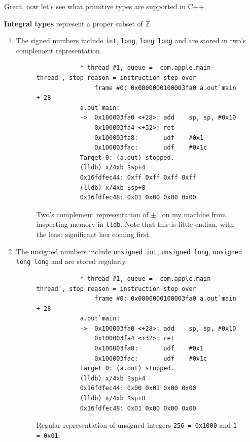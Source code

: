 \documentclass{article}
\newcounter{definition}[section]
\begin{document}
    Great, now let's see what primitive types are supported in C++.  
    
    \begin{definition}
      \label{def:integral-types}
      \textbf{Integral types} represent a proper subset of $\mathbb{Z}$. 
      \begin{enumerate}
        \item The signed numbers include \texttt{int}, \texttt{long}, \texttt{long long} and are stored in two's complement representation. 

        \begin{figure}[H]
          \centering 
          \begin{lstlisting}
            * thread #1, queue = 'com.apple.main-thread', stop reason = instruction step over
                frame #0: 0x0000000100003fa0 a.out`main + 28
            a.out`main:
            ->  0x100003fa0 <+28>: add    sp, sp, #0x10
                0x100003fa4 <+32>: ret    
                0x100003fa8:       udf    #0x1
                0x100003fac:       udf    #0x1c
            Target 0: (a.out) stopped.
            (lldb) x/4xb $sp+4
            0x16fdfec44: 0xff 0xff 0xff 0xff
            (lldb) x/4xb $sp+8
            0x16fdfec48: 0x01 0x00 0x00 0x00
          \end{lstlisting}
          \caption{Two's complement representation of $\pm1$ on my machine from inspecting memory in \texttt{lldb}. Note that this is little endian, with the least significant hex coming first.} 
          \label{fig:signed_rep}
        \end{figure} 

        \item The unsigned numbers include \texttt{unsigned int}, \texttt{unsigned long}, \texttt{unsigned long long} and are stored regularly. 

        \begin{figure}[H]
          \centering 
          \begin{lstlisting}
            * thread #1, queue = 'com.apple.main-thread', stop reason = instruction step over
                frame #0: 0x0000000100003fa0 a.out`main + 28
            a.out`main:
            ->  0x100003fa0 <+28>: add    sp, sp, #0x10
                0x100003fa4 <+32>: ret    
                0x100003fa8:       udf    #0x1
                0x100003fac:       udf    #0x1c
            Target 0: (a.out) stopped.
            (lldb) x/4xb $sp+4
            0x16fdfec44: 0x00 0x01 0x00 0x00
            (lldb) x/4xb $sp+8
            0x16fdfec48: 0x01 0x00 0x00 0x00
          \end{lstlisting}
          \caption{Regular representation of unsigned integers \texttt{256 = 0x1000} and \texttt{1 = 0x01}. }
          \label{fig:unsigned_rep}
        \end{figure} 
      \end{enumerate}
    \end{definition} 
\end{document}
